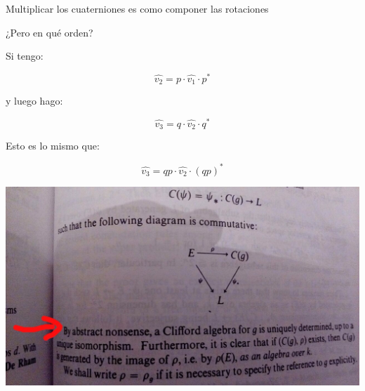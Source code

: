 \documentclass[10pt]{beamer}
\begin{document}
\begin{frame}{Multiplicar los cuaterniones es como componer las rotaciones}

    ¿Pero en qué orden? 
    
    Si tengo:
    
    $$\hat{v_2} = p \cdot \hat{v_1} \cdot p^*$$
    
    y luego hago:
    
    $$\hat{v_3} = q \cdot \hat{v_2} \cdot q^*$$ 
    
    Esto es lo mismo que:
    
    $$\hat{v_3} = qp \cdot \hat{v_2} \cdot (qp)^*$$
    
\end{frame}
\begin{frame}

    \includegraphics[scale=0.4]{nonsense.JPG}
    
\end{frame}
\end{document}
